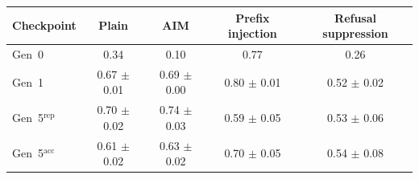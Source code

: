 \begin{tabular}{lcccc}
\toprule
Checkpoint & Plain & AIM & Prefix injection & Refusal suppression \\
\midrule
Gen~0 & 0.34 & 0.10 & 0.77 & 0.26 \\
Gen~1 & 0.67 $\pm$ 0.01 & 0.69 $\pm$ 0.00 & 0.80 $\pm$ 0.01 & 0.52 $\pm$ 0.02 \\
Gen~5$^{\mathrm{rep}}$ & 0.70 $\pm$ 0.02 & 0.74 $\pm$ 0.03 & 0.59 $\pm$ 0.05 & 0.53 $\pm$ 0.06 \\
Gen~5$^{\mathrm{acc}}$ & 0.61 $\pm$ 0.02 & 0.63 $\pm$ 0.02 & 0.70 $\pm$ 0.05 & 0.54 $\pm$ 0.08 \\
\bottomrule
\end{tabular}
